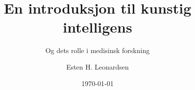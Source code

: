\documentclass[aspectratio=169]{beamer}
\title{En introduksjon til kunstig intelligens}
\subtitle{Og dets rolle i medisinsk forskning}
\author{Esten H. Leonardsen}
\date{\today}
\begin{document}
	\begin{frame}
	 	\titlepage
	\end{frame}

    
    
    
    
\end{document}

